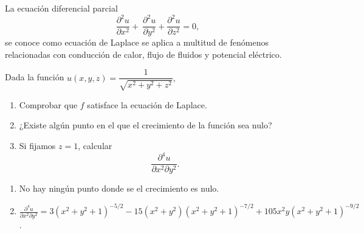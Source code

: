 {La ecuación diferencial parcial
\[
\displaystyle{\frac{\partial^2 u}{\partial x^2}} + \ \displaystyle{\frac{\partial^2 u}{\partial y^2}} + \displaystyle{\frac{\partial^2 u}{\partial z^2}} = 0,
\]
se conoce como ecuación de Laplace se aplica a multitud de fenómenos relacionadas con conducción de calor, flujo de fluidos y potencial eléctrico.

Dada la función $u(x,y,z)=\dfrac{1}{ \sqrt{x^2 + y^2 + z^2}},$
\begin{enumerate}
\item Comprobar que $f$ satisface la ecuación de Laplace.
\item ¿Existe algún punto en el que el crecimiento de la función sea nulo?
\item Si fijamos $z=1$, calcular
\[
\frac{\partial^4u}{\partial x^2\partial y^2}.
\]
\end{enumerate}
}
{
\begin{enumerate}[start=2]
\item No hay ningún punto donde se el crecimiento es nulo.
\item $\frac{{\partial ^4 u}}{{\partial x^2 \partial y^2 }} =3\left( {x^2  + y^2  + 1} \right)^{ - 5/2}  - 15\left( {x^2  + y^2
} \right)\left( {x^2  + y^2 + 1} \right)^{ - 7/2}  + 105x^2 y\left({x^2  + y^2  + 1} \right)^{ - 9/2}$.
\end{enumerate}
}
